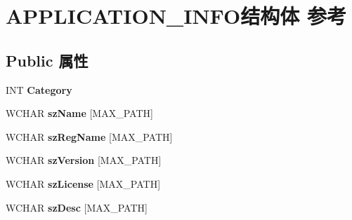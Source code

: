 \hypertarget{struct_a_p_p_l_i_c_a_t_i_o_n___i_n_f_o}{}\section{A\+P\+P\+L\+I\+C\+A\+T\+I\+O\+N\+\_\+\+I\+N\+F\+O结构体 参考}
\label{struct_a_p_p_l_i_c_a_t_i_o_n___i_n_f_o}
\subsection*{Public 属性}
\begin{DoxyCompactItemize}
\item 
\mbox{\label{struct_a_p_p_l_i_c_a_t_i_o_n___i_n_f_o_a78b2a8abc1d555471ff87eb23a265c55}} 
I\+NT {\bfseries Category}
\item 
\mbox{\label{struct_a_p_p_l_i_c_a_t_i_o_n___i_n_f_o_ad1245cc2458a56082e67633ce187506b}} 
W\+C\+H\+AR {\bfseries sz\+Name} \mbox{[}M\+A\+X\+\_\+\+P\+A\+TH\mbox{]}
\item 
\mbox{\label{struct_a_p_p_l_i_c_a_t_i_o_n___i_n_f_o_a396436c8643108c62a9678e83d96b6cf}} 
W\+C\+H\+AR {\bfseries sz\+Reg\+Name} \mbox{[}M\+A\+X\+\_\+\+P\+A\+TH\mbox{]}
\item 
\mbox{\label{struct_a_p_p_l_i_c_a_t_i_o_n___i_n_f_o_a5f606a9d494f21d20f10e2c272eab34e}} 
W\+C\+H\+AR {\bfseries sz\+Version} \mbox{[}M\+A\+X\+\_\+\+P\+A\+TH\mbox{]}
\item 
\mbox{\label{struct_a_p_p_l_i_c_a_t_i_o_n___i_n_f_o_aa85c286fd5ffb78f0a513f6e01cd103c}} 
W\+C\+H\+AR {\bfseries sz\+License} \mbox{[}M\+A\+X\+\_\+\+P\+A\+TH\mbox{]}
\item 
\mbox{\label{struct_a_p_p_l_i_c_a_t_i_o_n___i_n_f_o_a01711548fdcc4b249684e7bb5ae0dddd}} 
W\+C\+H\+AR {\bfseries sz\+Desc} \mbox{[}M\+A\+X\+\_\+\+P\+A\+TH\mbox{]}
\item 
\mbox{\label{struct_a_p_p_l_i_c_a_t_i_o_n___i_n_f_o_a248c5fe5c3561bb22c3a78586381a62e}} 

\end{DoxyCompactItemize}
